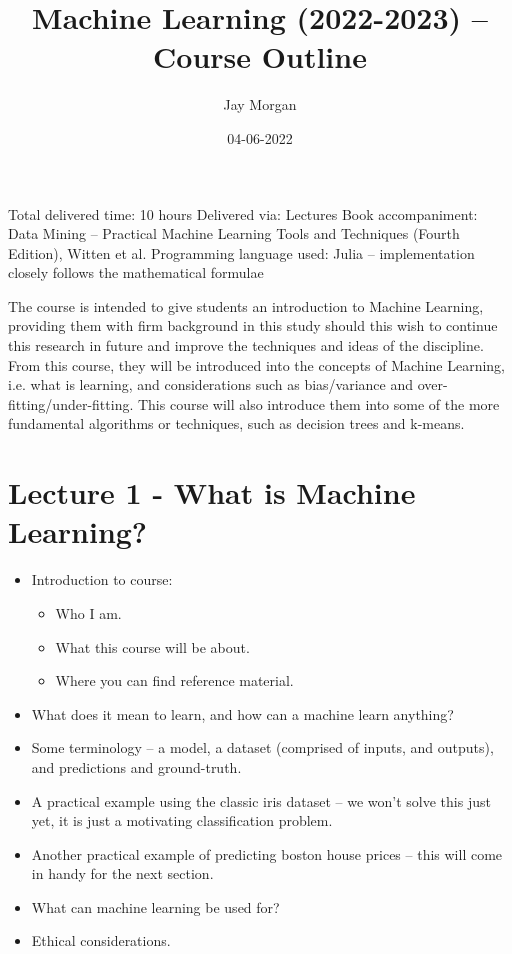 \documentclass[11pt]{article}
\author{Jay Morgan}
\date{04-06-2022}
\title{Machine Learning (2022-2023) -- Course Outline}
\begin{document}
\maketitle
\tableofcontents

Total delivered time: 10 hours
Delivered via: Lectures
Book accompaniment: Data Mining -- Practical Machine Learning Tools and Techniques
(Fourth Edition), Witten et al.
Programming language used: Julia -- implementation closely follows the mathematical formulae

The course is intended to give students an introduction to Machine Learning,
providing them with firm background in this study should this wish to continue this
research in future and improve the techniques and ideas of the discipline. From this
course, they will be introduced into the concepts of Machine Learning, i.e. what is
learning, and considerations such as bias/variance and
over-fitting/under-fitting. This course will also introduce them into some of the
more fundamental algorithms or techniques, such as decision trees and k-means.

\section{Lecture 1 - What is Machine Learning?}
\label{sec:org6ca7e23}

\begin{itemize}
\item Introduction to course:
\begin{itemize}
\item Who I am.
\item What this course will be about.
\item Where you can find reference material.
\end{itemize}

\item What does it mean to learn, and how can a machine learn anything?
\item Some terminology -- a model, a dataset (comprised of inputs, and outputs), and
predictions and ground-truth.
\item A practical example using the classic iris dataset -- we won't solve this just yet,
it is just a motivating classification problem.
\item Another practical example of predicting boston house prices -- this will come in
handy for the next section.
\item What can machine learning be used for?
\item Ethical considerations.
\end{itemize}
\end{document}
